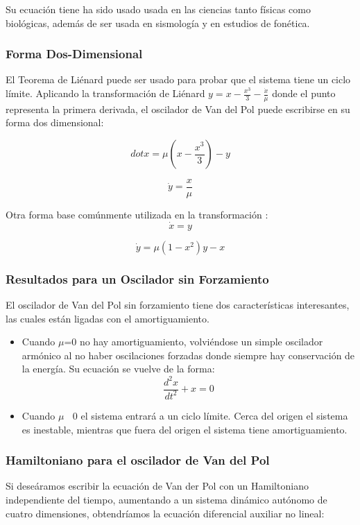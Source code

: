 \documentclass{article}
\begin{document}
Su ecuación tiene ha sido usado usada en las ciencias tanto físicas como biológicas, además de ser usada en sismología y en estudios de fonética.


\subsubsection{Forma Dos-Dimensional}
El Teorema de Liénard puede ser usado para probar que el sistema tiene un ciclo límite. Aplicando la transformación de Liénard $y = x - \frac{x^3}{3} - \frac{\dot{x}}{\mu}$  donde el punto representa la primera derivada, el oscilador de Van del Pol puede escribirse en su forma dos dimensional:

\[dot{x} = \mu (x - \frac{x^3}{3}) - y \]

\[\dot{y} = \frac{x}{\mu} \]

Otra forma base comúnmente utilizada en la transformación :
\[\dot{x} = y \]

\[\dot{y} = \mu (1 - x^2 )y - x \]


\subsubsection{Resultados para un Oscilador sin Forzamiento}
El oscilador de Van del Pol sin forzamiento tiene dos características interesantes, las cuales están ligadas con el amortiguamiento. 

\begin{itemize}
\item Cuando $\mu$=0 no hay amortiguamiento, volviéndose un simple oscilador armónico al no haber oscilaciones forzadas donde siempre hay conservación de la energía. Su ecuación se vuelve de la forma:
\[ \frac{d^2x}{dt^2} + x = 0 \]

\item Cuando $\mu$ $\>$ 0 el sistema entrará a un ciclo límite. Cerca del origen el sistema es inestable, mientras que fuera del origen el sistema tiene amortiguamiento.

\end{itemize}


\subsubsection{Hamiltoniano para el oscilador de Van del Pol}
Si deseáramos escribir la ecuación de Van der Pol con un Hamiltoniano independiente del tiempo, aumentando a un sistema dinámico autónomo de cuatro dimensiones, obtendríamos la ecuación diferencial auxiliar no lineal:
\end{document}

